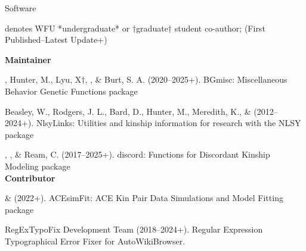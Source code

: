 \begin{rSection}{\textrm{Software}}%
\vspace{-1mm}\begin{center}\footnotesize{denotes WFU *undergraduate* or $\dagger$graduate$\dagger$ student co-author; (First Published–Latest Update+)}\end{center}\vspace{-1mm}

{\large \textbf {Maintainer}}%
\begin{etaremune}
\item\meb, Hunter, M., Lyu, X$\dagger$, \jt, \& Burt, S. A. (2020–2025+). BGmisc: Miscellaneous Behavior Genetic Functions \R package %

\item  Beasley, W., Rodgers, J. L., Bard, D., Hunter, M., Meredith, K., \& \meb  (2012–2024+). NlsyLinks: Utilities and kinship information for research with the NLSY \R package 

\item\meb, \jt, \& Ream, C. (2017–2025+). discord: Functions for Discordant Kinship Modeling \R package 
%
%
\smallskip\\
\hspace*{-8mm}\large{\bf{Contributor}}
\item \xyl  \& \meb (2022+). ACEsimFit: ACE Kin Pair Data Simulations and Model Fitting \R package 


\item RegExTypoFix Development Team (2018–2024+). Regular Expression Typographical Error Fixer for Auto\allowbreak WikiBrowser. 
%
%
%
\end{etaremune}
\end{rSection}
